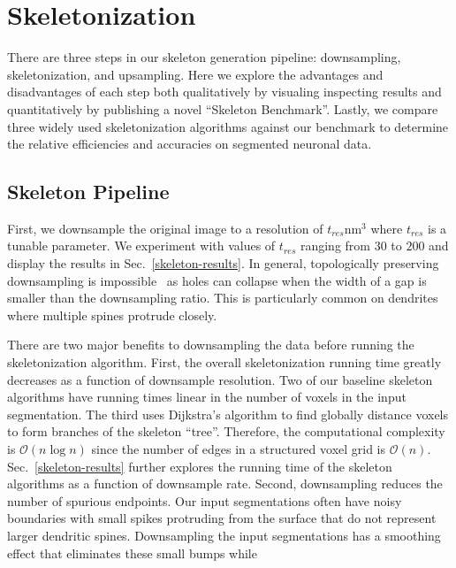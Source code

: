 \section{Skeletonization}

There are three steps in our skeleton generation pipeline: downsampling, skeletonization, and upsampling. 
Here we explore the advantages and disadvantages of each step both qualitatively by visualing inspecting results and quantitatively by publishing a novel ``Skeleton Benchmark''. 
Lastly, we compare three widely used skeletonization algorithms against our benchmark to determine the relative efficiencies and accuracies on segmented neuronal data.

\subsection{Skeleton Pipeline}

First, we downsample the original image to a resolution of $t_{res}\si{\nm^3}$ where $t_{res}$ is a tunable parameter. 
We experiment with values of $t_{res}$ ranging from $30$ to $200$ and display the results in Sec.~\ref{skeleton-results}.
In general, topologically preserving downsampling is impossible~\cite{kraus2001topology} as holes can collapse when the width of a gap is smaller than the downsampling ratio.
This is particularly common on dendrites where multiple spines protrude closely. 


There are two major benefits to downsampling the data before running the skeletonization algorithm.
First, the overall skeletonization running time greatly decreases as a function of downsample resolution.
Two of our baseline skeleton algorithms have running times linear in the number of voxels in the input segmentation.
The third uses Dijkstra's algorithm to find globally distance voxels to form branches of the skeleton ``tree''.
Therefore, the computational complexity is $\mathcal{O}(n \log{n})$ since the number of edges in a structured voxel grid is $\mathcal{O}(n)$.
Sec.~\ref{skeleton-results} further explores the running time of the skeleton algorithms as a function of downsample rate.
Second, downsampling reduces the number of spurious endpoints.
Our input segmentations often have noisy boundaries with small spikes protruding from the surface that do not represent larger dendritic spines.
Downsampling the input segmentations has a smoothing effect that eliminates these small bumps while 


